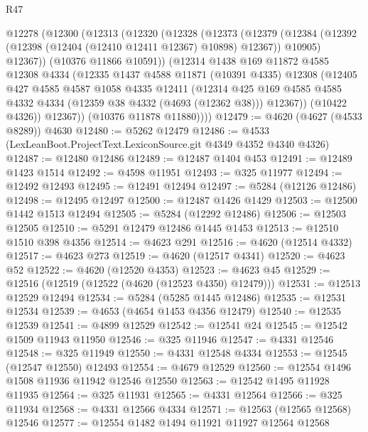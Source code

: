 \begin{lexlean}{R47}
\begin{coremodule}
    @12278
      (@12300
        (@12313
          (@12320
            (@12328
              (@12373
                (@12379
                  (@12384 (@12392 (@12398 (@12404 (@12410 @12411 @12367) @10898) @12367)) @10905)
                  @12367))
              (@10376 @11866 @10591))
            (@12314
              @1438
              @169
              @11872
              @4585
              @12308
              @4334
              (@12335
                @1437
                @4588
                @11871
                (@10391 @4335)
                @12308
                (@12405
                  @427
                  @4585
                  @4587
                  @1058
                  @4335
                  @12411
                  (@12314
                    @425
                    @169
                    @4585
                    @4585
                    @4332
                    @4334
                    (@12359 @38 @4332 (@4693 (@12362 @38)))
                    @12367))
                (@10422 @4326))
              @12367))
          (@10376 @11878 @11880))))
@12479 := @4620 (@4627 (@4533 @8289)) @4630
@12480 := @5262 @12479
@12486 := @4533 (LexLeanBoot.ProjectText.LexiconSource.git @4349 @4352 @4340 @4326)
@12487 := @12480 @12486
@12489 := @12487 @1404 @453
@12491 := @12489 @1423 @1514
@12492 := @4598 @11951
@12493 := @325 @11977
@12494 := @12492 @12493
@12495 := @12491 @12494
@12497 := @5284 (@12126 @12486)
@12498 := @12495 @12497
@12500 := @12487 @1426 @1429
@12503 := @12500 @1442 @1513 @12494
@12505 := @5284 (@12292 @12486)
@12506 := @12503 @12505
@12510 := @5291 @12479 @12486 @1445 @1453
@12513 := @12510 @1510 @398 @4356
@12514 := @4623 @291
@12516 := @4620 (@12514 @4332)
@12517 := @4623 @273
@12519 := @4620 (@12517 @4341)
@12520 := @4623 @52
@12522 := @4620 (@12520 @4353)
@12523 := @4623 @45
@12529 := @12516 (@12519 (@12522 (@4620 (@12523 @4350) @12479)))
@12531 := @12513 @12529 @12494
@12534 := @5284 (@5285 @1445 @12486)
@12535 := @12531 @12534
@12539 := @4653 (@4654 @1453 @4356 @12479)
@12540 := @12535 @12539
@12541 := @4899 @12529
@12542 := @12541 @24
@12545 := @12542 @1509 @11943 @11950
@12546 := @325 @11946
@12547 := @4331 @12546
@12548 := @325 @11949
@12550 := @4331 @12548 @4334
@12553 := @12545 (@12547 @12550) @12493
@12554 := @4679 @12529
@12560 := @12554 @1496 @1508 @11936 @11942 @12546 @12550
@12563 := @12542 @1495 @11928 @11935
@12564 := @325 @11931
@12565 := @4331 @12564
@12566 := @325 @11934
@12568 := @4331 @12566 @4334
@12571 := @12563 (@12565 @12568) @12546
@12577 := @12554 @1482 @1494 @11921 @11927 @12564 @12568

\end{coremodule}
\end{lexlean}
